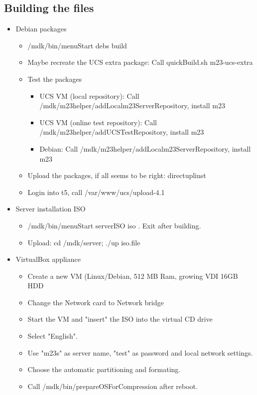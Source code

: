 \subsection{Building the files}
\begin{itemize}
\item Debian packages
	\begin{itemize}
		\item /mdk/bin/menuStart \Rightarrow debs \Rightarrow build
		\item Maybe recreate the UCS extra package: Call quickBuild.sh m23-ucs-extra
		\item Test the packages
		\begin{itemize}
			\item UCS VM (local repository): Call /mdk/m23helper/addLocalm23ServerRepository, install m23
			\item UCS VM (online test repository): Call /mdk/m23helper/addUCSTestRepository, install m23
			\item Debian: Call /mdk/m23helper/addLocalm23ServerRepository, install m23
		\end{itemize}
		\item Upload the packages, if all seems to be right: \Rightarrow directuplinst
		\item Login into t5, call /var/www/ucs/upload-4.1
	\end{itemize}
\item Server installation ISO
	\begin{itemize}
		\item /mdk/bin/menuStart \Rightarrow serverISO \Rightarrow iso . Exit after building.
		\item Upload: cd /mdk/server; ./up iso.file
	\end{itemize}
\item VirtualBox appliance
	\begin{itemize}
		\item Create a new VM (Linux/Debian, 512 MB Ram, growing VDI 16GB HDD
		\item Change the Network card to Network bridge
		\item Start the VM and "insert" the ISO into the virtual CD drive
		\item Select "English".
		\item Use "m23s" as server name, "test" as password and local network settings.
		\item Choose the automatic partitioning and formating.
		\item Call /mdk/bin/prepareOSForCompression after reboot.

\end{itemize}
\end{itemize}

